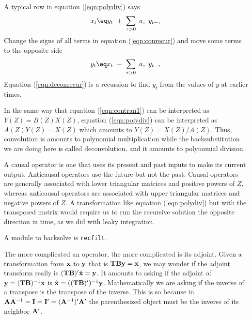\par
A typical row in equation (\ref{eqn:polydiv}) says
\begin{equation}
x_t \eq y_t \ +\ \sum_{\tau > 0} \ a_\tau\ y_{t-\tau}
\label{eqn:conrecur}
\end{equation}
Change the signs of all terms in equation
(\ref{eqn:conrecur})
and
move some terms to the opposite side
\begin{equation}
y_t \eq x_t \ -\ \sum_{\tau > 0} \ a_\tau\ y_{t-\tau}
\label{eqn:deconrecur}
\end{equation}
Equation (\ref{eqn:deconrecur}) is a recursion
to find $y_t$ from the values of $y$ at earlier times.

\par
In the same way that
equation (\ref{eqn:contran1})
can be interpreted as $Y(Z)=B(Z)X(Z)$,
equation (\ref{eqn:polydiv})
can be interpreted as $A(Z) Y(Z) = X(Z)$
which amounts to
$Y(Z) = X(Z)/A(Z)$.
Thus, convolution is amounts to polynomial multiplication
while the backsubstitution we are doing here
is called deconvolution, and it amounts to polynomial division.




\par
A causal operator is one that uses its present and past inputs
to make its current output.
Anticausal operators use the future but not the past.
Causal operators are generally associated with lower triangular matrices
and positive powers of $Z$, whereas
anticausal operators are associated with upper triangular matrices
and negative powers of $Z$.
A transformation like equation
(\ref{eqn:polydiv})
but with the transposed matrix would require us
to run the recursive solution the opposite direction in time,
as we did with leaky integration.


\par
A module to backsolve  is \texttt{recfilt}.

\par
The more complicated an operator, the more complicated is its adjoint.
Given a transformation from $\bold x$ to $\bold y$ that is
$\bold T\bold B \bold y = \bold x$,
we may wonder if the adjoint transform really is
$(\bold T\bold B)' \hat{\bold x}= \bold y$.
It amounts to asking if the adjoint of
$\bold y = (\bold T\bold B)^{-1}\bold x$ is
$\hat{\bold x} = ((\bold T\bold B)')^{-1}\bold y$.
Mathematically we are asking if
the inverse of a transpose is the transpose of the inverse.
This is so because in
$\bold A\bold A^{-1} = \bold I = \bold I' = (\bold A^{-1})'\bold A'$
the parenthesized object must be the inverse of its neighbor $\bold A'$.



